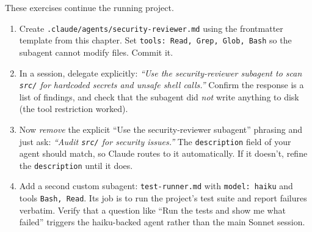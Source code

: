 \begin{exercisebox}
These exercises continue the running project.

\begin{enumerate}
  \item Create \texttt{.claude/agents/security-reviewer.md} using the
        frontmatter template from this chapter. Set
        \texttt{tools: Read, Grep, Glob, Bash} so the subagent cannot
        modify files. Commit it.
  \item In a session, delegate explicitly:
        \emph{``Use the security-reviewer subagent to scan
        \texttt{src/} for hardcoded secrets and unsafe shell calls.''}
        Confirm the response is a list of findings, and check that the
        subagent did \emph{not} write anything to disk (the tool restriction
        worked).
  \item Now \emph{remove} the explicit ``Use the security-reviewer
        subagent'' phrasing and just ask: \emph{``Audit \texttt{src/}
        for security issues.''} The \texttt{description} field of your
        agent should match, so Claude routes to it automatically. If it
        doesn't, refine the \texttt{description} until it does.
  \item Add a second custom subagent: \texttt{test-runner.md} with
        \texttt{model: haiku} and tools \texttt{Bash, Read}. Its job is
        to run the project's test suite and report failures verbatim.
        Verify that a question like ``Run the tests and show me what
        failed'' triggers the haiku-backed agent rather than the main
        Sonnet session.
\end{enumerate}
\end{exercisebox}

